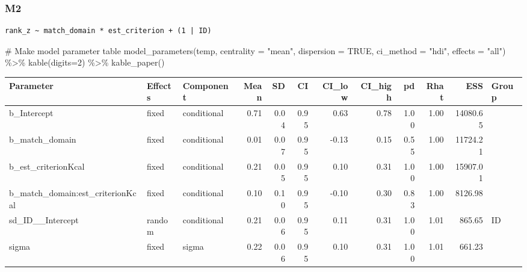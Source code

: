 \documentclass[
  letterpaper,
  DIV=11,
  numbers=noendperiod]{scrartcl}
\newenvironment{Shaded}{\begin{snugshade}}{\end{snugshade}}
\newcommand{\AttributeTok}[1]{\textcolor[rgb]{0.40,0.45,0.13}{#1}}
\newcommand{\CommentTok}[1]{\textcolor[rgb]{0.37,0.37,0.37}{#1}}
\newcommand{\ConstantTok}[1]{\textcolor[rgb]{0.56,0.35,0.01}{#1}}
\newcommand{\DecValTok}[1]{\textcolor[rgb]{0.68,0.00,0.00}{#1}}
\newcommand{\FunctionTok}[1]{\textcolor[rgb]{0.28,0.35,0.67}{#1}}
\newcommand{\NormalTok}[1]{\textcolor[rgb]{0.00,0.23,0.31}{#1}}
\newcommand{\OtherTok}[1]{\textcolor[rgb]{0.00,0.23,0.31}{#1}}
\newcommand{\SpecialCharTok}[1]{\textcolor[rgb]{0.37,0.37,0.37}{#1}}
\newcommand{\StringTok}[1]{\textcolor[rgb]{0.13,0.47,0.30}{#1}}
\begin{document}
\subsubsection{M2}\label{m2-1}

\begin{Shaded}
\end{Shaded}

\begin{verbatim}
rank_z ~ match_domain * est_criterion + (1 | ID) 
\end{verbatim}

\begin{Shaded}
\begin{Highlighting}[]
\CommentTok{\# Make model parameter table}
\FunctionTok{model\_parameters}\NormalTok{(temp, }\AttributeTok{centrality =} \StringTok{"mean"}\NormalTok{, }\AttributeTok{dispersion =} \ConstantTok{TRUE}\NormalTok{, }
                 \AttributeTok{ci\_method =} \StringTok{"hdi"}\NormalTok{, }\AttributeTok{effects =} \StringTok{"all"}\NormalTok{) }\SpecialCharTok{\%\textgreater{}\%} 
  \FunctionTok{kable}\NormalTok{(}\AttributeTok{digits=}\DecValTok{2}\NormalTok{) }\SpecialCharTok{\%\textgreater{}\%} \FunctionTok{kable\_paper}\NormalTok{()}
\end{Highlighting}
\end{Shaded}

\begin{longtable*}[t]{lllrrrrrrrrl}
\toprule
Parameter & Effects & Component & Mean & SD & CI & CI\_low & CI\_high & pd & Rhat & ESS & Group\\
\midrule
b\_Intercept & fixed & conditional & 0.71 & 0.04 & 0.95 & 0.63 & 0.78 & 1.00 & 1.00 & 14080.65 & \\
b\_match\_domain & fixed & conditional & 0.01 & 0.07 & 0.95 & -0.13 & 0.15 & 0.55 & 1.00 & 11724.21 & \\
b\_est\_criterionKcal & fixed & conditional & 0.21 & 0.05 & 0.95 & 0.10 & 0.31 & 1.00 & 1.00 & 15907.01 & \\
b\_match\_domain:est\_criterionKcal & fixed & conditional & 0.10 & 0.10 & 0.95 & -0.10 & 0.30 & 0.83 & 1.00 & 8126.98 & \\
sd\_ID\_\_Intercept & random & conditional & 0.21 & 0.06 & 0.95 & 0.11 & 0.31 & 1.00 & 1.01 & 865.65 & ID\\
\addlinespace
sigma & fixed & sigma & 0.22 & 0.06 & 0.95 & 0.10 & 0.31 & 1.00 & 1.01 & 661.23 & \\
\bottomrule
\end{longtable*}
\end{document}
